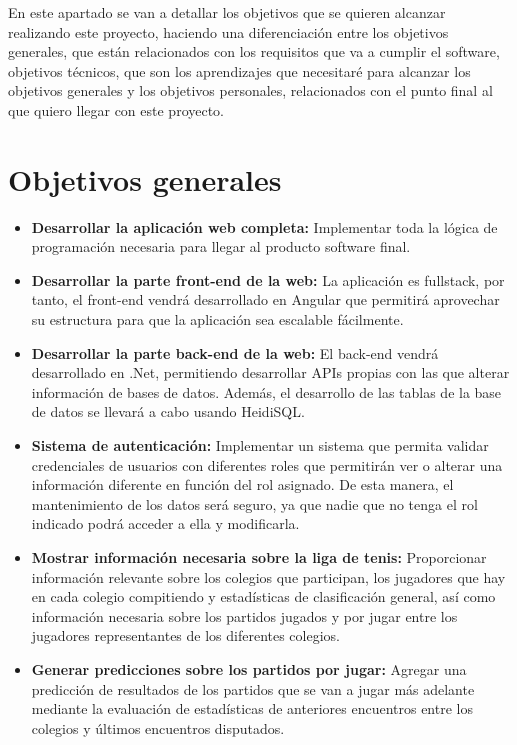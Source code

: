 
En este apartado se van a detallar los objetivos que se quieren alcanzar realizando este proyecto, haciendo una diferenciación entre los objetivos generales, que están relacionados con los requisitos que va a cumplir el software, objetivos técnicos, que son los aprendizajes que necesitaré para alcanzar los objetivos generales y los objetivos personales, relacionados con el punto final al que quiero llegar con este proyecto.

\section{Objetivos generales}\label{objetivos-generales}

\begin{itemize}
\tightlist
\item	
\textbf{Desarrollar la aplicación web completa:} Implementar toda la lógica de programación necesaria para llegar al producto software final.

\item
\textbf{Desarrollar la parte front-end de la web:} La aplicación es fullstack, por tanto, el front-end vendrá desarrollado en Angular que permitirá aprovechar su estructura para que la aplicación sea escalable fácilmente.

\item
\textbf{Desarrollar la parte back-end de la web:} El back-end vendrá desarrollado en .Net, permitiendo desarrollar APIs propias con las que alterar información de bases de datos. Además, el desarrollo de las tablas de la base de datos se llevará a cabo usando HeidiSQL.

\item
\textbf{Sistema de autenticación:} Implementar un sistema que permita validar credenciales de usuarios con diferentes roles que permitirán ver o alterar una información diferente en función del rol asignado. De esta manera, el mantenimiento de los datos será seguro, ya que nadie que no tenga el rol indicado podrá acceder a ella y modificarla.

\item
\textbf{Mostrar información necesaria sobre la liga de tenis:} Proporcionar información relevante sobre los colegios que participan, los jugadores que hay en cada colegio compitiendo y estadísticas de clasificación general, así como información necesaria sobre los partidos jugados y por jugar entre los jugadores representantes de los diferentes colegios.

\item
\textbf{Generar predicciones sobre los partidos por jugar:} Agregar una predicción de resultados de los partidos que se van a jugar más adelante mediante la evaluación de estadísticas de anteriores encuentros entre los colegios y últimos encuentros disputados.
\end{itemize}




